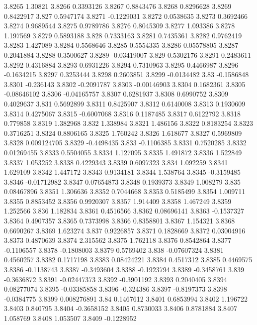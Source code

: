3.8265  1.30821
3.8266  0.3393126
3.8267  0.8843476
3.8268  0.8296628
3.8269  0.8422917
3.827  0.5947174
3.8271  -0.1229031
3.8272  0.0538635
3.8273  0.3692466
3.8274  0.9689544
3.8275  0.9789786
3.8276  0.8045309
3.8277  1.093386
3.8278  1.197569
3.8279  0.5893188
3.828  0.7333163
3.8281  0.7435361
3.8282  0.9762419
3.8283  1.427089
3.8284  0.5568646
3.8285  0.5554335
3.8286  0.05578805
3.8287  0.2041884
3.8288  0.3500627
3.8289  -0.03419007
3.829  0.5302176
3.8291  0.2483611
3.8292  0.4316884
3.8293  0.6931226
3.8294  0.7310963
3.8295  0.4466987
3.8296  -0.1634215
3.8297  0.3253444
3.8298  0.2603851
3.8299  -0.0134482
3.83  -0.1586848
3.8301  -0.236143
3.8302  -0.2091787
3.8303  -0.00146903
3.8304  0.1682361
3.8305  -0.08646102
3.8306  -0.04165757
3.8307  0.6281937
3.8308  0.6990752
3.8309  0.4029637
3.831  0.5692899
3.8311  0.8425907
3.8312  0.6140008
3.8313  0.1930609
3.8314  0.4275067
3.8315  -0.6007068
3.8316  0.1187485
3.8317  0.6122792
3.8318  0.779858
3.8319  1.382968
3.832  1.338984
3.8321  1.486156
3.8322  0.8183254
3.8323  0.3716251
3.8324  0.8806165
3.8325  1.760242
3.8326  1.618677
3.8327  0.5969809
3.8328  0.009124705
3.8329  -0.4498435
3.833  -0.1106385
3.8331  0.7520285
3.8332  0.01269455
3.8333  0.5504055
3.8334  1.127095
3.8335  1.491872
3.8336  1.522849
3.8337  1.053252
3.8338  0.4229343
3.8339  0.6097323
3.834  1.092259
3.8341  1.629109
3.8342  1.447172
3.8343  0.9134181
3.8344  1.538764
3.8345  -0.3159485
3.8346  -0.01712982
3.8347  0.07654873
3.8348  0.1939373
3.8349  1.008279
3.835  0.08467896
3.8351  1.306636
3.8352  0.7044668
3.8353  0.5185499
3.8354  1.009711
3.8355  0.8853452
3.8356  0.9920307
3.8357  1.914409
3.8358  1.467249
3.8359  1.252566
3.836  1.182834
3.8361  0.4516566
3.8362  0.08696141
3.8363  -0.1537327
3.8364  0.4907357
3.8365  0.7373998
3.8366  0.8358801
3.8367  1.154321
3.8368  0.6690267
3.8369  1.623274
3.837  0.9226857
3.8371  0.1828669
3.8372  0.03004916
3.8373  0.4870639
3.8374  2.315562
3.8375  1.762118
3.8376  0.8542864
3.8377  -0.1106557
3.8378  -0.1808003
3.8379  0.5769402
3.838  -0.07607324
3.8381  0.4560257
3.8382  0.1717198
3.8383  0.08424221
3.8384  0.4517312
3.8385  0.4469575
3.8386  -0.1138743
3.8387  -0.3493604
3.8388  -0.1923794
3.8389  -0.3458761
3.839  -0.3636872
3.8391  -0.02447373
3.8392  -0.3901192
3.8393  0.2040405
3.8394  0.08277074
3.8395  -0.03385858
3.8396  -0.324386
3.8397  -0.8197373
3.8398  -0.0384775
3.8399  0.008276891
3.84  0.1467612
3.8401  0.6853994
3.8402  1.196722
3.8403  0.840795
3.8404  -0.3658152
3.8405  0.8730033
3.8406  0.8781884
3.8407  1.058769
3.8408  1.053507
3.8409  -0.1228952
